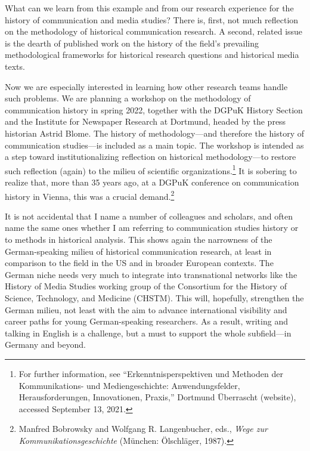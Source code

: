 \documentclass{tufte-handout}
\begin{document}
What can we learn from this example and from our research experience for
the history of communication and media studies? There is, first, not
much reflection on the methodology of historical communication research.
A second, related issue is the dearth of published work on the history
of the field's prevailing methodological frameworks for historical
research questions and historical media texts.

Now we are especially interested in learning how other research teams
handle such problems. We are planning a workshop on the methodology of
communication history in spring 2022, together with the DGPuK History
Section and the Institute for Newspaper Research at Dortmund, headed by
the press historian Astrid Blome. The history of methodology---and
therefore the history of communication studies---is included as a main
topic. The workshop is intended as a step toward institutionalizing
reflection on historical methodology---to restore such reflection
(again) to the milieu of scientific organizations.\footnote{For further
  information, see ``Erkenntnisperspektiven und Methoden der
  Kommunikations- und Mediengeschichte: Anwendungsfelder,
  Herausforderungen, Innovationen, Praxis,'' Dortmund Überrascht
  (website), accessed September 13, 2021.} It is sobering to realize
that, more than 35 years ago, at a DGPuK conference on communication
history in Vienna, this was a crucial demand.\footnote{Manfred Bobrowsky
  and Wolfgang R. Langenbucher, eds., \emph{Wege zur
  Kommunikationsgeschichte} (München: Ölschläger, 1987).}

It is not accidental that I name a number of colleagues and scholars,
and often name the same ones whether I am referring to communication
studies history or to methods in historical analysis. This shows again
the narrowness of the German-speaking milieu of historical communication
research, at least in comparison to the field in the US and in broader
European contexts. The German niche needs very much to integrate into
transnational networks like the History of Media Studies working group
of the Consortium for the History of Science, Technology, and Medicine
(CHSTM). This will, hopefully, strengthen the German milieu, not least
with the aim to advance international visibility and career paths for
young German-speaking researchers. As a result, writing and talking in
English is a challenge, but a must to support the whole subfield---in
Germany and beyond.
\end{document}

